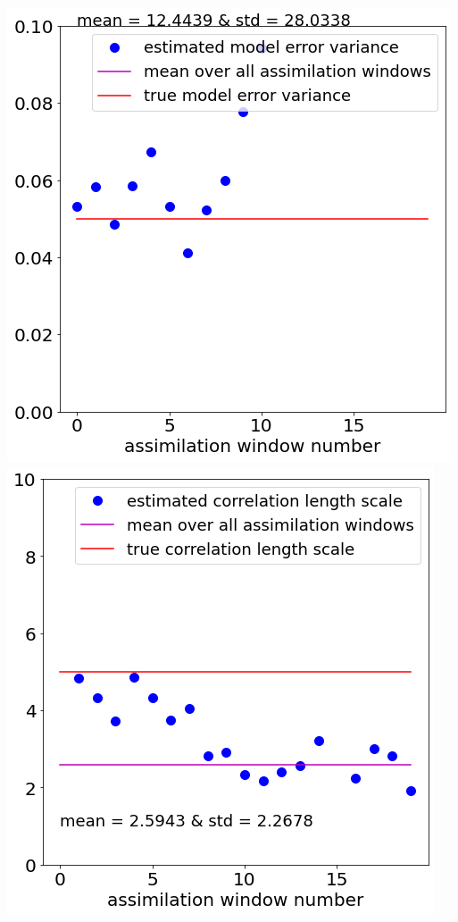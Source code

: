 \documentclass[a4paper,10pt]{article}
\numberwithin{equation}{section}
\begin{document}
\includegraphics[scale=0.4]{Ex6var}
\includegraphics[scale=0.4]{Ex6len}\\
\end{document}
